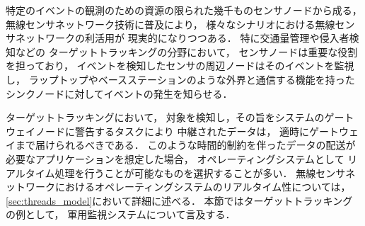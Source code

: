 
特定のイベントの観測のための資源の限られた幾千ものセンサノードから成る，
無線センサネットワーク技術に普及により，
様々なシナリオにおける無線センサネットワークの利活用が
現実的になりつつある．
特に交通量管理や侵入者検知などの
ターゲットトラッキングの分野において，
センサノードは重要な役割を担っており，
イベントを検知したセンサの周辺ノードはそのイベントを監視し，
ラップトップやベースステーションのような外界と通信する機能を持った
シンクノードに対してイベントの発生を知らせる．

ターゲットトラッキングにおいて，
対象を検知し，その旨をシステムのゲートウェイノードに警告するタスクにより
中継されたデータは，
適時にゲートウェイまで届けられるべきである．
このような時間的制約を伴ったデータの配送が必要なアプリケーションを想定した場合，
オペレーティングシステムとして
リアルタイム処理を行うことが可能なものを選択することが多い．
無線センサネットワークにおけるオペレーティングシステムのリアルタイム性については，
\ref{sec:threads_model}において詳細に述べる．
本節ではターゲットトラッキングの例として，
軍用監視システムについて言及する．

